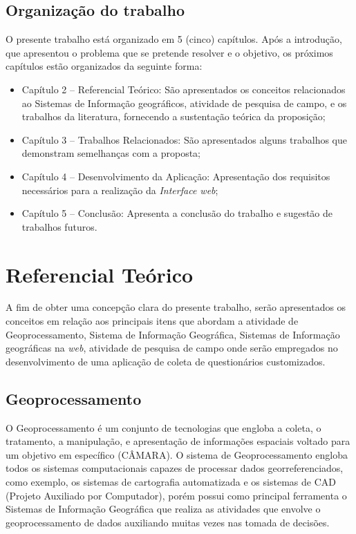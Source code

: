 \documentclass[
	12pt,				%
    oneside,			%
	a4paper,			%
	english,			%
	french,				%
	spanish,			%
	brazil,				%
	]{abntex2}
\begin{document}
\section{Organização do trabalho}
O presente trabalho está organizado em 5 (cinco) capítulos. Após a introdução, que apresentou o problema que se pretende resolver e o objetivo, os próximos capítulos estão organizados da seguinte forma: 
\begin{itemize}
    \item Capítulo 2 – Referencial Teórico: São apresentados os conceitos relacionados ao Sistemas de Informação geográficos, atividade de pesquisa de campo, e os trabalhos da literatura, fornecendo a sustentação teórica da proposição;
    \item Capítulo 3 – Trabalhos Relacionados: São apresentados alguns trabalhos que demonstram semelhanças com a proposta;
    \item Capítulo 4 – Desenvolvimento da Aplicação: Apresentação dos requisitos necessários para a realização da \textit{Interface web};
    \item Capítulo 5 – Conclusão: Apresenta a conclusão do trabalho e sugestão de trabalhos futuros.
\end{itemize}
	
\chapter{Referencial Teórico}
A fim de obter uma concepção clara do presente trabalho, serão apresentados os conceitos em relação aos principais itens que abordam a atividade de Geoprocessamento, Sistema de Informação Geográfica, Sistemas de Informação geográficas na \textit{web}, atividade de pesquisa de campo onde serão empregados no desenvolvimento de uma aplicação de coleta de questionários customizados.

\section{Geoprocessamento}
O Geoprocessamento é um conjunto de tecnologias que engloba a coleta, o tratamento, a manipulação, e apresentação de informações espaciais voltado para um objetivo em específico (CÂMARA). O sistema de Geoprocessamento engloba todos os sistemas computacionais capazes de processar dados georreferenciados, como exemplo, os sistemas de cartografia automatizada e os sistemas de CAD (Projeto Auxiliado por Computador), porém possui como principal ferramenta o Sistemas de Informação Geográfica que realiza as atividades que envolve o geoprocessamento de dados auxiliando muitas vezes nas tomada de decisões. 
\end{document}
